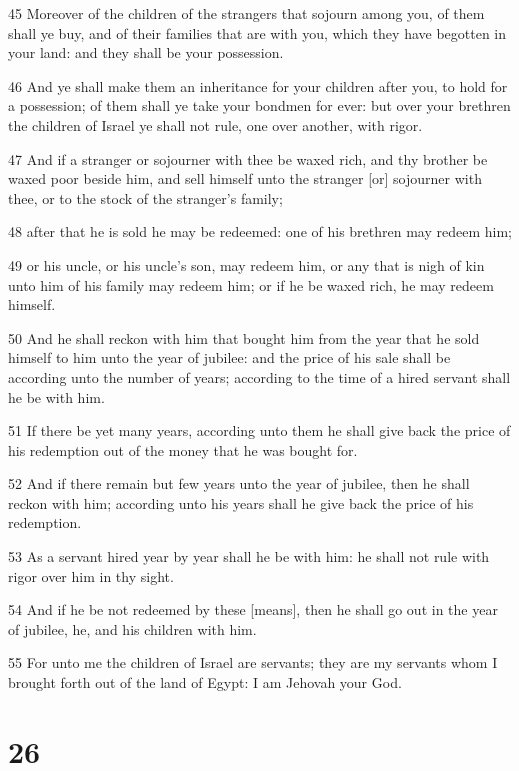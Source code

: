 \par 45 Moreover of the children of the strangers that sojourn among you, of them shall ye buy, and of their families that are with you, which they have begotten in your land: and they shall be your possession.
\par 46 And ye shall make them an inheritance for your children after you, to hold for a possession; of them shall ye take your bondmen for ever: but over your brethren the children of Israel ye shall not rule, one over another, with rigor.
\par 47 And if a stranger or sojourner with thee be waxed rich, and thy brother be waxed poor beside him, and sell himself unto the stranger [or] sojourner with thee, or to the stock of the stranger's family;
\par 48 after that he is sold he may be redeemed: one of his brethren may redeem him;
\par 49 or his uncle, or his uncle's son, may redeem him, or any that is nigh of kin unto him of his family may redeem him; or if he be waxed rich, he may redeem himself.
\par 50 And he shall reckon with him that bought him from the year that he sold himself to him unto the year of jubilee: and the price of his sale shall be according unto the number of years; according to the time of a hired servant shall he be with him.
\par 51 If there be yet many years, according unto them he shall give back the price of his redemption out of the money that he was bought for.
\par 52 And if there remain but few years unto the year of jubilee, then he shall reckon with him; according unto his years shall he give back the price of his redemption.
\par 53 As a servant hired year by year shall he be with him: he shall not rule with rigor over him in thy sight.
\par 54 And if he be not redeemed by these [means], then he shall go out in the year of jubilee, he, and his children with him.
\par 55 For unto me the children of Israel are servants; they are my servants whom I brought forth out of the land of Egypt: I am Jehovah your God.

\chapter{26}

